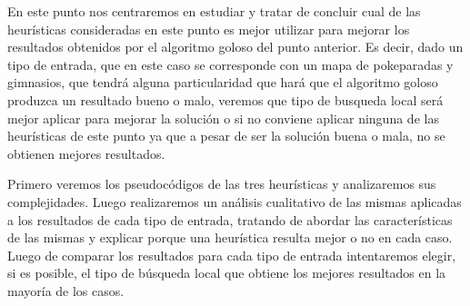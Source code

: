 En este punto nos centraremos en estudiar y tratar de concluir cual de las heurísticas consideradas en este punto es mejor utilizar para mejorar los resultados obtenidos por el algoritmo goloso del punto anterior. Es decir, dado un tipo de entrada, que en este caso se corresponde con un mapa de pokeparadas y gimnasios, que tendrá alguna particularidad que hará que el algoritmo goloso produzca un resultado bueno o malo, veremos que tipo de busqueda local será mejor aplicar para mejorar la solución o si no conviene aplicar ninguna de las heurísticas de este punto ya que a pesar de ser la solución buena o mala, no se obtienen mejores resultados.

Primero veremos los pseudocódigos de las tres heurísticas y analizaremos sus complejidades. Luego realizaremos un análisis cualitativo de las mismas aplicadas a los resultados de cada tipo de entrada, tratando de abordar las características de las mismas y explicar porque una heurística resulta mejor o no en cada caso. Luego de comparar los resultados para cada tipo de entrada intentaremos elegir, si es posible, el tipo de búsqueda local que obtiene los mejores resultados en la mayoría de los casos.

